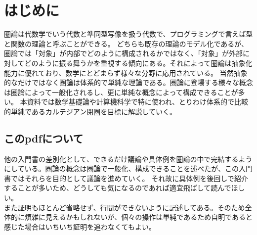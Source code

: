 \section{はじめに}
  圏論は代数学でいう代数と準同型写像を扱う代数で、プログラミングで言えば型と関数の理論と呼ぶことができる。
  どちらも既存の理論のモデル化であるが、圏論では「対象」が内部でどのように構成されるかではなく、「対象」が外部に対してどのように振る舞うかを重視する傾向にある。それによって圏論は抽象化能力に優れており、数学にとどまらず様々な分野に応用されている。
  当然抽象的なだけではなく圏論は体系的で単純な理論である。圏論に登場する様々な概念は圏論によって一般化されるし、更に単純な概念によって構成できることが多い。
	本資料では数学基礎論や計算機科学で特に使われ、とりわけ体系的で比較的単純であるカルテジアン閉圏を目標に解説していく。

  \subsection{このpdfについて}
	他の入門書の差別化として、できるだけ議論や具体例を圏論の中で完結するようにしている。圏論の概念は圏論で一般化、構成できることを述べたが、この入門書ではそれらを目的として議論を進めていく。
  それ故に具体例を後回しで紹介することが多いため、どうしても気になるのであれば適宜飛ばして読んでほしい。\\
  また証明もほとんど省略せず、行間ができないように記述してある。そのため全体的に煩雑に見えるかもしれないが、個々の操作は単純であるため自明であると感じた場合はいちいち証明を追わなくてもよい。\\
